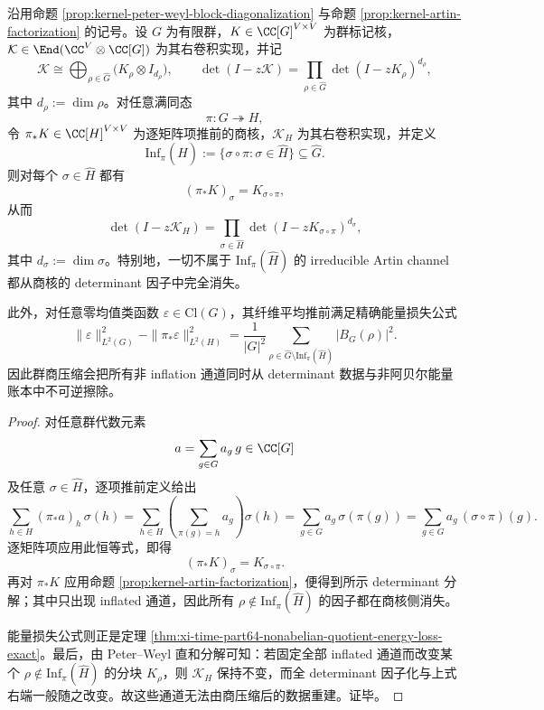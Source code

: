 \begin{theorem}\label{thm:xi-time-part9x-nonabelian-artin-channel-quotient-erasure}
沿用命题 \ref{prop:kernel-peter-weyl-block-diagonalization} 与命题 \ref{prop:kernel-artin-factorization} 的记号。设 \(G\) 为有限群，\(K\in\CC[G]^{V\times V}\) 为群标记核，\(\mathcal K\in\End(\CC^V\otimes\CC[G])\) 为其右卷积实现，并记
\[
\mathcal K\cong \bigoplus_{\rho\in\widehat G}\bigl(K_\rho\otimes I_{d_\rho}\bigr),
\qquad
\det(I-z\mathcal K)=\prod_{\rho\in\widehat G}\det(I-zK_\rho)^{d_\rho},
\]
其中 \(d_\rho:=\dim\rho\)。对任意满同态
\[
\pi:G\twoheadrightarrow H,
\]
令 \(\pi_*K\in\CC[H]^{V\times V}\) 为逐矩阵项推前的商核，\(\mathcal K_H\) 为其右卷积实现，并定义
\[
\mathrm{Inf}_\pi(\widehat H):=\{\sigma\circ\pi:\sigma\in\widehat H\}\subseteq \widehat G.
\]
则对每个 \(\sigma\in\widehat H\) 都有
\[
(\pi_*K)_\sigma=K_{\sigma\circ\pi},
\]
从而
\[
\det(I-z\mathcal K_H)=\prod_{\sigma\in\widehat H}\det(I-zK_{\sigma\circ\pi})^{d_\sigma},
\]
其中 \(d_\sigma:=\dim\sigma\)。特别地，一切不属于 \(\mathrm{Inf}_\pi(\widehat H)\) 的 irreducible Artin channel 都从商核的 determinant 因子中完全消失。

此外，对任意零均值类函数 \(\varepsilon\in\mathrm{Cl}(G)\)，其纤维平均推前满足精确能量损失公式
\[
\|\varepsilon\|_{L^2(G)}^2-\|\pi_*\varepsilon\|_{L^2(H)}^2
=
\frac1{|G|^2}
\sum_{\rho\in\widehat G\setminus\mathrm{Inf}_\pi(\widehat H)}
\bigl|B_G(\rho)\bigr|^2.
\]
因此群商压缩会把所有非 inflation 通道同时从 determinant 数据与非阿贝尔能量账本中不可逆擦除。
\end{theorem}
\begin{proof}
对任意群代数元素
\[
a=\sum_{g\in G}a_g\,g\in\CC[G]
\]
及任意 \(\sigma\in\widehat H\)，逐项推前定义给出
\[
\sum_{h\in H}(\pi_*a)_h\,\sigma(h)
=
\sum_{h\in H}\left(\sum_{\pi(g)=h}a_g\right)\sigma(h)
=
\sum_{g\in G}a_g\,\sigma(\pi(g))
=
\sum_{g\in G}a_g\,(\sigma\circ\pi)(g).
\]
逐矩阵项应用此恒等式，即得
\[
(\pi_*K)_\sigma=K_{\sigma\circ\pi}.
\]
再对 \(\pi_*K\) 应用命题 \ref{prop:kernel-artin-factorization}，便得到所示 determinant 分解；其中只出现 inflated 通道，因此所有 \(\rho\notin\mathrm{Inf}_\pi(\widehat H)\) 的因子都在商核侧消失。

能量损失公式则正是定理 \ref{thm:xi-time-part64-nonabelian-quotient-energy-loss-exact}。最后，由 Peter--Weyl 直和分解可知：若固定全部 inflated 通道而改变某个 \(\rho\notin\mathrm{Inf}_\pi(\widehat H)\) 的分块 \(K_\rho\)，则 \(\mathcal K_H\) 保持不变，而全 determinant 因子化与上式右端一般随之改变。故这些通道无法由商压缩后的数据重建。证毕。
\end{proof}

